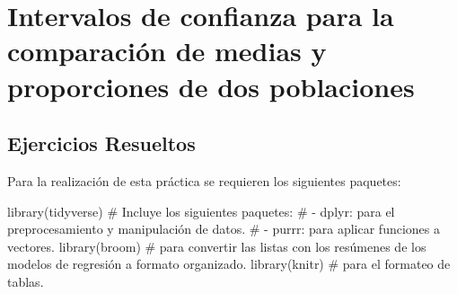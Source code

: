 \documentclass[
  a4paper,
]{scrreport}
\newenvironment{Shaded}{\begin{snugshade}}{\end{snugshade}}
\newcommand{\CommentTok}[1]{\textcolor[rgb]{0.37,0.37,0.37}{#1}}
\newcommand{\FunctionTok}[1]{\textcolor[rgb]{0.28,0.35,0.67}{#1}}
\newcommand{\NormalTok}[1]{\textcolor[rgb]{0.00,0.23,0.31}{#1}}
\theoremstyle{definition}
\theoremstyle{remark}
\begin{document}

\hypertarget{intervalos-de-confianza-para-la-comparaciuxf3n-de-medias-y-proporciones-de-dos-poblaciones}{%
\chapter{Intervalos de confianza para la comparación de medias y
proporciones de dos
poblaciones}\label{intervalos-de-confianza-para-la-comparaciuxf3n-de-medias-y-proporciones-de-dos-poblaciones}}

\hypertarget{ejercicios-resueltos-6}{%
\section{Ejercicios Resueltos}\label{ejercicios-resueltos-6}}

Para la realización de esta práctica se requieren los siguientes
paquetes:

\begin{Shaded}
\begin{Highlighting}[]
\FunctionTok{library}\NormalTok{(tidyverse)}
\CommentTok{\# Incluye los siguientes paquetes:}
\CommentTok{\# {-} dplyr: para el preprocesamiento y manipulación de datos.}
\CommentTok{\# {-} purrr: para aplicar funciones a vectores.}
\FunctionTok{library}\NormalTok{(broom) }\CommentTok{\# para convertir las listas con los resúmenes de los modelos de regresión a formato organizado.}
\FunctionTok{library}\NormalTok{(knitr) }\CommentTok{\# para el formateo de tablas.}
\end{Highlighting}
\end{Shaded}
\end{document}
